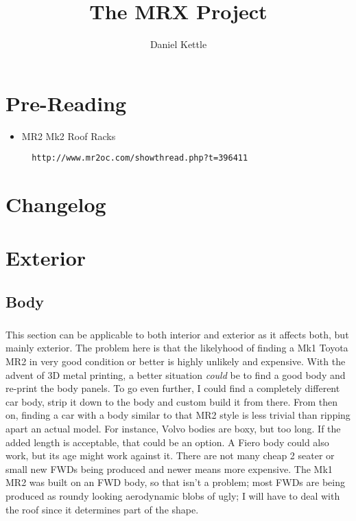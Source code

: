 \documentclass[a4paper,10pt]{report}
\title{The MRX  Project}
\author{Daniel Kettle}
\begin{document}

\maketitle


\begin{abstract}
\end{abstract}

\chapter{Pre-Reading}
\begin{itemize}
 \item MR2 Mk2 Roof Racks 
 \begin{verbatim}
  http://www.mr2oc.com/showthread.php?t=396411
 \end{verbatim}

\end{itemize}


\chapter{Changelog}

\chapter{Exterior}

\section{Body}
\paragraph*{}This section can be applicable to both interior and exterior as it affects both, but mainly exterior. The problem here is that the likelyhood of finding a Mk1 Toyota MR2 in very good condition or better is highly unlikely and expensive. With the advent of 3D metal printing, a better situation \textit{could} be to find a good body and re-print the body panels. To go even further, I could find a completely different car body, strip it down to the body and custom build it from there. From then on, finding a car with a body similar to that MR2 style is less trivial than ripping apart an actual model. For instance, Volvo bodies are boxy, but too long. If the added length is acceptable, that could be an option. A Fiero body could also work, but its age might work against it. There are not many cheap 2 seater or small new FWDs being produced and newer means more expensive. The Mk1 MR2 was built on an FWD body, so that isn't a problem; most FWDs are being produced as roundy looking aerodynamic blobs of ugly; I will have to deal with the roof since it determines part of the shape.
\end{document}
